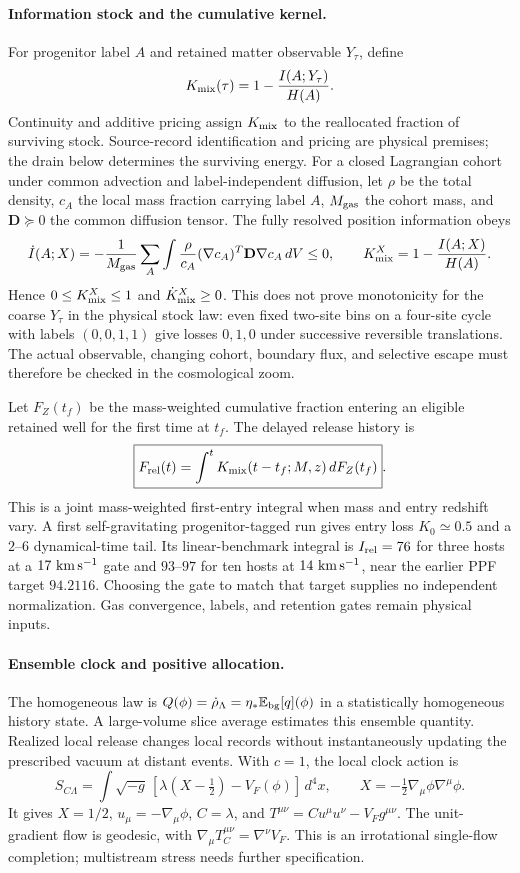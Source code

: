 \documentclass[11pt]{article}
\begin{document}
\paragraph{Information stock and the cumulative kernel.}
For progenitor label $A$ and retained matter observable $Y_\tau$, define
\[
K_{\rm mix}(\tau)=1-\frac{I(A;Y_\tau)}{H(A)}.
\]
Continuity and additive pricing assign $K_{\rm mix}$ to the reallocated fraction of surviving stock. Source-record identification and pricing are physical premises; the drain below determines the surviving energy. For a closed Lagrangian cohort under common advection and label-independent diffusion, let $\rho$ be the total density, $c_A$ the local mass fraction carrying label $A$, $M_{\rm gas}$ the cohort mass, and $\mathbf D\succeq0$ the common diffusion tensor. The fully resolved position information obeys
\[
\dot I(A;X)=-\frac1{M_{\rm gas}}\sum_A\int
\frac{\rho}{c_A}(\nabla c_A)^T\mathbf D\nabla c_A\,dV\le0,
\qquad
K_{\rm mix}^{X}=1-\frac{I(A;X)}{H(A)}.
\]
Hence $0\le K_{\rm mix}^{X}\le1$ and $\dot K_{\rm mix}^{X}\ge0$. This does not prove monotonicity for the coarse $Y_\tau$ in the physical stock law: even fixed two-site bins on a four-site cycle with labels $(0,0,1,1)$ give losses $0,1,0$ under successive reversible translations. The actual observable, changing cohort, boundary flux, and selective escape must therefore be checked in the cosmological zoom.

Let $F_Z(t_f)$ be the mass-weighted cumulative fraction entering an eligible retained well for the first time at $t_f$. The delayed release history is
\[
\boxed{F_{\rm rel}(t)=\int^tK_{\rm mix}(t-t_f;M,z)\,dF_Z(t_f)}.
\]
This is a joint mass-weighted first-entry integral when mass and entry redshift vary. A first self-gravitating progenitor-tagged run gives entry loss $K_0\simeq0.5$ and a $2$--$6$ dynamical-time tail. Its linear-benchmark integral is $I_{\rm rel}=76$ for three hosts at a $17\ {\rm km\,s^{-1}}$ gate and $93$--$97$ for ten hosts at $14\ {\rm km\,s^{-1}}$, near the earlier PPF target $94.2116$. Choosing the gate to match that target supplies no independent normalization. Gas convergence, labels, and retention gates remain physical inputs.

\paragraph{Ensemble clock and positive allocation.}
The homogeneous law is $Q(\phi)=\dot\rho_\Lambda=\eta_*\mathbb E_{\rm bg}[q](\phi)$ in a statistically homogeneous history state. A large-volume slice average estimates this ensemble quantity. Realized local release changes local records without instantaneously updating the prescribed vacuum at distant events. With $c=1$, the local clock action is \citep{ChamseddineMukhanov2013,ChamseddineMukhanovVikman2014}
\[
S_{C\Lambda}=\int\sqrt{-g}\,[\lambda(X-\tfrac12)-V_F(\phi)]\,d^4x,
\qquad X=-\tfrac12\nabla_\mu\phi\nabla^\mu\phi.
\]
It gives $X=1/2$, $u_\mu=-\nabla_\mu\phi$, $C=\lambda$, and $T^{\mu\nu}=Cu^\mu u^\nu-V_Fg^{\mu\nu}$. The unit-gradient flow is geodesic, with $\nabla_\mu T_C^{\mu\nu}=\nabla^\nu V_F$. This is an irrotational single-flow completion; multistream stress needs further specification.
\end{document}
